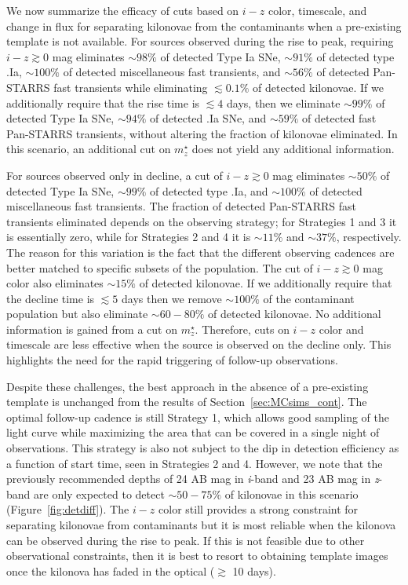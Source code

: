 We now summarize the efficacy of cuts based on $i-z$ color, timescale, and change in flux for separating kilonovae from the contaminants when a pre-existing template is not available. For sources observed during the rise to peak, requiring $i-z\gtrsim0$ mag eliminates $\sim98\%$ of detected Type Ia SNe, $\sim91\%$ of detected type .Ia, $\sim100\%$ of detected miscellaneous fast transients, and $\sim 56\%$ of detected Pan-STARRS fast transients while eliminating $\lesssim0.1\%$ of detected kilonovae. If we additionally require that the rise time is $\lesssim4$ days, then we eliminate $\sim99\%$ of detected Type Ia SNe, $\sim94\%$ of detected .Ia SNe, and $\sim59\%$ of detected fast Pan-STARRS transients, without altering the fraction of kilonovae eliminated. In this scenario, an additional cut on $m^{\star}_z$ does not yield any additional information.

For sources observed only in decline, a cut of $i-z\gtrsim0$ mag eliminates $\sim50\%$ of detected Type Ia SNe, $\sim99\%$ of detected type .Ia, and $\sim 100\%$ of detected miscellaneous fast transients. The fraction of detected Pan-STARRS fast transients eliminated depends on the observing strategy; for Strategies 1 and 3 it is essentially zero, while for Strategies 2 and 4 it is $\sim11\%$ and $\sim37\%$, respectively. The reason for this variation is the fact that the different observing cadences are better matched to specific subsets of the population. The cut of $i-z\gtrsim0$ mag color also eliminates $\sim 15\%$ of detected kilonovae. If we additionally require that the decline time is $\lesssim 5$ days then we remove $\sim100\%$ of the contaminant population but also eliminate $\sim60-80\%$ of detected kilonovae. No additional information is gained from a cut on $m^{\star}_z$. Therefore, cuts on $i-z$ color and timescale are less effective when the source is observed on the decline only. This highlights the need for the rapid triggering of follow-up observations.
  
Despite these challenges, the best approach in the absence of a pre-existing template is unchanged from the results of Section~\ref{sec:MCsims_cont}. The optimal follow-up cadence is still Strategy 1, which allows good sampling of the light curve while maximizing the area that can be covered in a single night of observations. This strategy is also not subject to the dip in detection efficiency as a function of start time, seen in Strategies 2 and 4. However, we note that the previously recommended depths of 24 AB mag in {\em i}-band and 23 AB mag in {\em z}-band are only expected to detect $\sim50-75\%$ of kilonovae in this scenario (Figure~\ref{fig:detdiff}). The $i-z$ color still provides a strong constraint for separating kilonovae from contaminants but it is most reliable when the kilonova can be observed during the rise to peak. If this is not feasible due to other observational constraints, then it is best to resort to obtaining template images once the kilonova has faded in the optical ($\gtrsim$ 10 days). 

